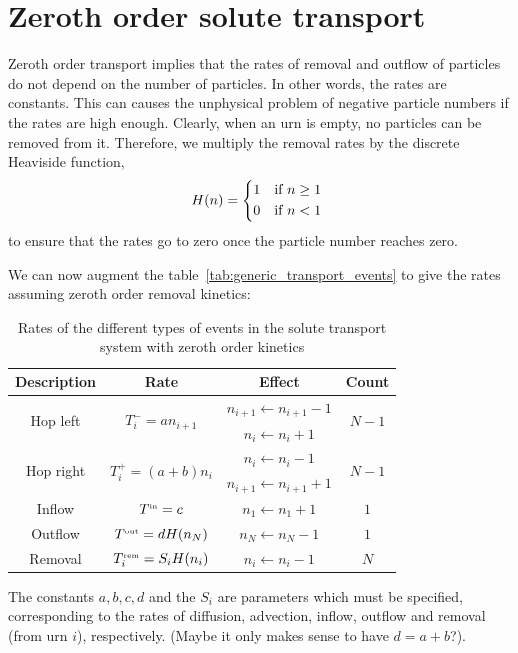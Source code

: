 \section{Zeroth order solute transport}
Zeroth order transport implies that the rates of removal and outflow of
particles do not depend on the number of particles. In other words, the rates
are constants. This can causes the unphysical problem of negative particle numbers if the
rates are high enough. Clearly, when an urn is empty, no particles can be
removed from it. Therefore, we multiply the removal rates by the discrete
Heaviside function,
\begin{equation*}
    H(n) =
    \begin{dcases*}
        1 & if \(n \ge 1\)\\
        0 & if \(n < 1\)
    \end{dcases*}
\end{equation*}
 to ensure that the rates go to zero once the particle number reaches zero.

We can now augment the table~\ref{tab:generic_transport_events} to give the
rates assuming zeroth order removal kinetics:
\begin{table}[ht!]
    \centering
    \begin{tabular}{ c | c | c | c }
        Description & Rate & Effect & Count \\ \hline\hline
        \multirow{2}{*}{Hop left} & \multirow{2}{*}{\(T^-_i = a n_{i+1}\)} &
        \(n_{i+1} \leftarrow n_{i+1} - 1\) & \multirow{2}{*}{\(N-1\)} \\
        & & \(n_i \leftarrow n_i + 1\) \\ \hline
        \multirow{2}{*}{Hop right} & \multirow{2}{*}{\(T^+_i = (a+b) n_i\)} &
        \(n_i \leftarrow n_i - 1\) & \multirow{2}{*}{\(N-1\)} \\
        & & \(n_{i+1} \leftarrow n_{i+1} + 1\) \\ \hline
        Inflow & \(T^\text{\tiny in} = c\) & \(n_1 \leftarrow n_1 + 1\) & \(1\) \\ \hline
        Outflow & \(T^\text{\tiny out} = d H(n_N)\) & \(n_N \leftarrow n_N - 1\) & \(1\) \\ \hline
        Removal & \(T^\text{\tiny rem}_i = S_i H(n_i)\) & \(n_i \leftarrow n_i - 1\) & \(N\) \\
    \end{tabular}
    \caption{\label{tab:zeroth_order_transport_events}Rates of the different types of
events in the solute transport system with zeroth order kinetics}
\end{table}
The constants \(a,b,c,d\) and the \(S_i\) are parameters which must be
specified, corresponding to the rates of diffusion, advection, inflow, outflow
and removal (from urn \(i\)), respectively. (Maybe it only makes sense to have
\(d=a+b\)?).

